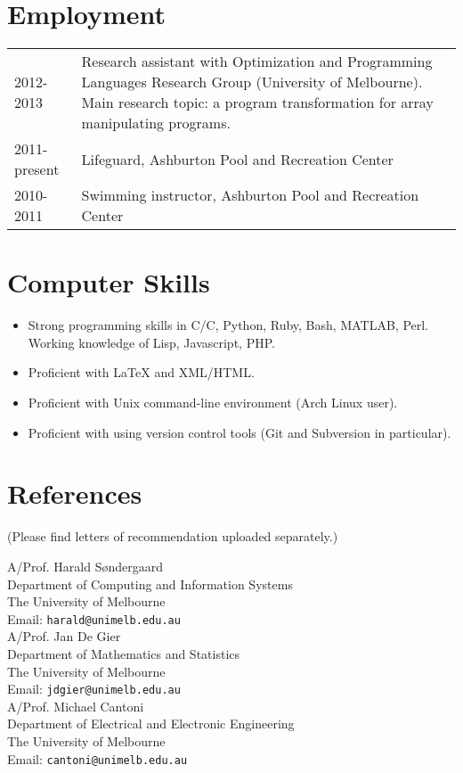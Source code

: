 \documentclass[12pt,a4paper]{article}
\newcommand{\CPP}
{C\nolinebreak[4]\hspace{-.05em}\raisebox{.22ex}{\footnotesize\bf ++ }}
\newenvironment{llist}
	{\renewcommand{\arraystretch}{1.5}\begin{tabular}{p{3cm} p{12cm}}}
	{\end{tabular}}
\begin{document}
\section*{Employment}
\begin{llist}
  2012-2013 & Research assistant with Optimization and Programming Languages
  Research Group (University of Melbourne). Main research topic: a program
  transformation for array manipulating programs. \\
	2011-present & Lifeguard, Ashburton Pool and Recreation Center \\
	2010-2011 & Swimming instructor, Ashburton Pool and Recreation Center \\
\end{llist}

\section*{Computer Skills}
\begin{itemize}
  \item Strong programming skills in C/\CPP, Python, Ruby, Bash, MATLAB,
    Perl. Working knowledge of Lisp, Javascript, PHP. 
	\item Proficient with {\LaTeX} and XML/HTML.
  \item Proficient with Unix command-line environment (Arch Linux user).
  \item Proficient with using version control tools (Git and Subversion in
    particular).
\end{itemize}

\pagebreak
\section*{References}
(Please find letters of recommendation uploaded separately.)

\noindent
A/Prof. Harald S\o ndergaard  \\
Department of Computing and Information Systems \\
The University of Melbourne \\
Email: \texttt{harald@unimelb.edu.au} \\

\noindent
A/Prof. Jan De Gier \\
Department of Mathematics and Statistics\\
The University of Melbourne \\
Email: \texttt{jdgier@unimelb.edu.au} \\

\noindent
A/Prof. Michael Cantoni \\
Department of Electrical and Electronic Engineering \\
The University of Melbourne \\
Email: \texttt{cantoni@unimelb.edu.au}

\hfill \qedsymbol
\end{document}
